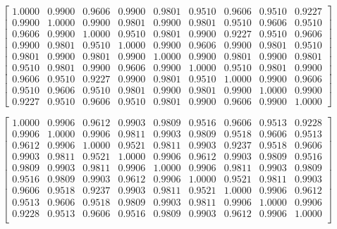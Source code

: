 \documentclass{article}
\begin{document}
\begin{equation}
\label{cov.theory}
\begin{bmatrix}
1.0000 &   0.9900 &   0.9606  &  0.9900   & 0.9801  &  0.9510 &   0.9606  &  0.9510  &  0.9227\\
    0.9900  &  1.0000  &  0.9900  &  0.9801  &  0.9900  &  0.9801 &   0.9510  &  0.9606  &  0.9510\\
    0.9606 &   0.9900  &  1.0000  &  0.9510   & 0.9801 &   0.9900  &  0.9227   & 0.9510  &  0.9606\\
    0.9900  &  0.9801 &   0.9510   & 1.0000   & 0.9900  &  0.9606  &  0.9900  &  0.9801 &   0.9510\\
    0.9801  &  0.9900  &  0.9801 &   0.9900  &  1.0000  &  0.9900   & 0.9801   & 0.9900  &  0.9801\\
    0.9510  &  0.9801 &   0.9900  &  0.9606  &  0.9900  &  1.0000 &   0.9510  &  0.9801 &   0.9900\\
    0.9606  &  0.9510  &  0.9227  &  0.9900  &  0.9801  &  0.9510  &  1.0000  &  0.9900 &   0.9606\\
    0.9510  &  0.9606  &  0.9510  &  0.9801  &  0.9900  &  0.9801  &  0.9900  &  1.0000 &   0.9900\\
0.9227   & 0.9510  &  0.9606  &  0.9510  &  0.9801  &  0.9900 &   0.9606 &   0.9900  & 1.0000

\end{bmatrix}
\end{equation}

\begin{equation}
\label{cov.empirical}
\begin{bmatrix}
1.0000  &  0.9906  &  0.9612  &  0.9903  &  0.9809  &  0.9516  &  0.9606  &  0.9513  &  0.9228\\
    0.9906  &  1.0000 &   0.9906  &  0.9811  &  0.9903  &  0.9809  &  0.9518  &  0.9606  &  0.9513 \\
    0.9612  &   0.9906  &   1.0000& 0.9521 &    0.9811 &    0.9903  &   0.9237  &   0.9518 &    0.9606 \\
    0.9903 &    0.9811 &    0.9521  &   1.0000  &   0.9906  &   0.9612  &   0.9903  &   0.9809  &   0.9516 \\
    0.9809  &   0.9903  &   0.9811  &   0.9906  &   1.0000  &   0.9906 &    0.9811  &   0.9903  &   0.9809 \\
    0.9516  &   0.9809 &    0.9903 &   0.9612  &   0.9906 &    1.0000 &    0.9521  &   0.9811&     0.9903 \\
    0.9606  &   0.9518  &   0.9237  &   0.9903  &   0.9811 &    0.9521 &   1.0000  &   0.9906 &    0.9612 \\
    0.9513   &  0.9606  &   0.9518 &    0.9809 &    0.9903  &   0.9811  &   0.9906  &   1.0000   &  0.9906 \\
    0.9228  &   0.9513 &    0.9606  &   0.9516  &   0.9809  &   0.9903  &   0.9612  &   0.9906  &   1.0000 \\
\end{bmatrix} 
\end{equation}
\end{document}
